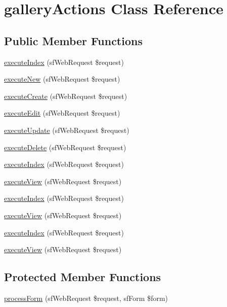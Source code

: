 \hypertarget{classgallery_actions}{\section{gallery\-Actions Class Reference}
\label{classgallery_actions}
}
\subsection*{Public Member Functions}
\begin{DoxyCompactItemize}
\item 
\hyperlink{classgallery_actions_a948cc911eb1d9f77990be54af3b2080f}{execute\-Index} (sf\-Web\-Request \$request)
\item 
\hyperlink{classgallery_actions_a0ffbea56560c6c633dae68ec22aff21c}{execute\-New} (sf\-Web\-Request \$request)
\item 
\hyperlink{classgallery_actions_a75837617743fb64dca82d8133b2c662a}{execute\-Create} (sf\-Web\-Request \$request)
\item 
\hyperlink{classgallery_actions_af4d8fedd4b28f3398826a1bb8fa54394}{execute\-Edit} (sf\-Web\-Request \$request)
\item 
\hyperlink{classgallery_actions_af7b4f51862add3c2ebb54efc136a0840}{execute\-Update} (sf\-Web\-Request \$request)
\item 
\hyperlink{classgallery_actions_a52b5b11b11a0070dd2662257520c045a}{execute\-Delete} (sf\-Web\-Request \$request)
\item 
\hyperlink{classgallery_actions_a948cc911eb1d9f77990be54af3b2080f}{execute\-Index} (sf\-Web\-Request \$request)
\item 
\hyperlink{classgallery_actions_ad61d212fa3f7e8cb4190700a8a670606}{execute\-View} (sf\-Web\-Request \$request)
\item 
\hyperlink{classgallery_actions_a948cc911eb1d9f77990be54af3b2080f}{execute\-Index} (sf\-Web\-Request \$request)
\item 
\hyperlink{classgallery_actions_ad61d212fa3f7e8cb4190700a8a670606}{execute\-View} (sf\-Web\-Request \$request)
\item 
\hyperlink{classgallery_actions_a948cc911eb1d9f77990be54af3b2080f}{execute\-Index} (sf\-Web\-Request \$request)
\item 
\hyperlink{classgallery_actions_ad61d212fa3f7e8cb4190700a8a670606}{execute\-View} (sf\-Web\-Request \$request)
\end{DoxyCompactItemize}
\subsection*{Protected Member Functions}
\begin{DoxyCompactItemize}
\item 
\hyperlink{classgallery_actions_a7cf661d837626e0320753cbffa019a01}{process\-Form} (sf\-Web\-Request \$request, sf\-Form \$form)
\end{DoxyCompactItemize}


